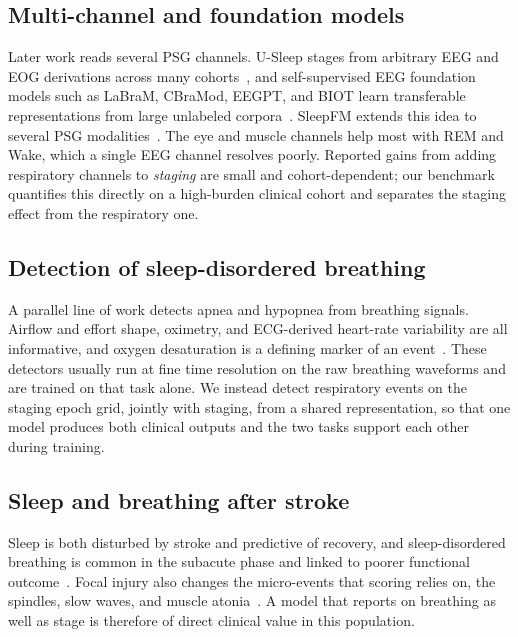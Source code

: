 \documentclass[journal]{IEEEtran}
\begin{document}
\subsection{Multi-channel and foundation models}
Later work reads several PSG channels. U-Sleep stages from arbitrary EEG and EOG derivations
across many cohorts~\cite{perslev2021usleep}, and self-supervised EEG foundation models such
as LaBraM, CBraMod, EEGPT, and BIOT learn transferable representations from large unlabeled
corpora~\cite{labram2024,cbramod2025,eegpt2024,biot2023}. SleepFM extends this idea to several
PSG modalities~\cite{sleepfm2026}. The eye and muscle channels help most with REM and Wake,
which a single EEG channel resolves poorly. Reported gains from adding respiratory channels to
\emph{staging} are small and cohort-dependent; our benchmark quantifies this directly on a
high-burden clinical cohort and separates the staging effect from the respiratory one.

\subsection{Detection of sleep-disordered breathing}
A parallel line of work detects apnea and hypopnea from breathing signals. Airflow and effort
shape, oximetry, and ECG-derived heart-rate variability are all informative, and oxygen
desaturation is a defining marker of an event~\cite{jing2025cpap}. These detectors usually run
at fine time resolution on the raw breathing waveforms and are trained on that task alone. We
instead detect respiratory events on the staging epoch grid, jointly with staging, from a
shared representation, so that one model produces both clinical outputs and the two tasks
support each other during training.

\subsection{Sleep and breathing after stroke}
Sleep is both disturbed by stroke and predictive of recovery, and sleep-disordered breathing
is common in the subacute phase and linked to poorer functional
outcome~\cite{bassetti2006sleep,denis2024sleep}. Focal injury also changes the micro-events
that scoring relies on, the spindles, slow waves, and muscle
atonia~\cite{gottselig2002stroke,fernandez2019spindles,simpson2023laterality}. A model that
reports on breathing as well as stage is therefore of direct clinical value in this
population.

\end{document}
